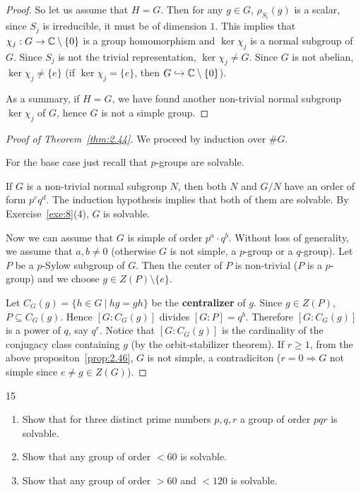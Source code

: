 \documentclass[twoside = false,	%
		headsepline,		%
		parskip = true,
		]{scrbook}						%
\begin{document}
\begin{proof}
        So let us assume that $H=G$. Then for any $g \in G$, $\rho_{S_i}(g)$ is a scalar, since $S_j$ is irreducible, it must be of dimension $1$.
        This implies that $\chi_j: G \to \mathbb C \setminus \{0\}$ is a group homomorphism and $\ker \chi_j$ is a normal subgroup of $G$. Since $S_j$ is not the trivial representation, $\ker \chi_j \neq G$.
        Since $G$ is not abelian, $\ker \chi_j \neq \{e\}$ (if $\ker \chi_j = \{e\}$, then $G \hookrightarrow \mathbb C \setminus\{0\}$).

        As a summary, if $H=G$, we have found another non-trivial normal subgroup $\ker \chi_j$ of $G$, hence $G$ is not a simple group.
    \end{proof}

    \begin{proof}[Proof of Theorem~\ref{thm:2.44}]

        We proceed by induction over $\#G$.

        For the base case just recall that $p$-groups are solvable.

        If $G$ is a non-trivial normal subgroup $N$, then both $N$ and $G/N$ have an order of form $p^c q^d$. The induction hypothesis implies that both of them are solvable.
        By Exercise~\ref{exe:8}(4), $G$ is solvable.

        Now we can assume that $G$ is simple of order $p^a\cdot q^b$. Without loss of generality, we assume that $a,b \neq 0$ (otherwise $G$ is not simple, a $p$-group or a $q$-group).
        Let $P$ be a $p$-Sylow subgroup of $G$. Then the center of $P$ is non-trivial ($P$ is a $p$-group) and we choose $g \in Z(P) \setminus\{e\}$.

        Let $C_G(g) = \{h \in G \ | \ hg = gh\}$ be the \textbf{centralizer} of $g$. Since $g \in Z(P)$, $P \subseteq C_G(g)$.
        Hence $[G:C_G(g)]$ divides $[G:P] = q^b$. Therefore $[G:C_G(g)]$ is a power of $q$, say $q^r$. Notice that $[G:C_G(g)]$ is the cardinality of the conjugacy class containing $g$ (by the orbit-stabilizer theorem).
        If $r \geq 1$, from the above propositon~\ref{prop:2.46}, $G$ is not simple, a contradiciton ($r=0 \Rightarrow G$ not simple since $e \neq g \in Z(G)$).
    \end{proof}

    \begin{exercise}{}{15}
        \begin{enumerate}
            \item Show that for three distinct prime numbers $p,q,r$ a group of order $pqr$ is solvable.
            \item Show that any group of order $<60$ is solvable.
            \item Show that any group of order $>60$ and $<120$ is solvable. 
        \end{enumerate}
    \end{exercise}
    
\end{document}
